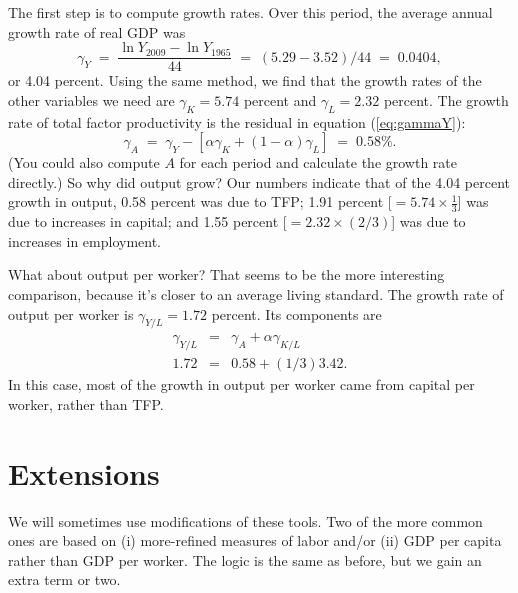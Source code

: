 The first step is to compute growth rates.
Over this period, the average annual growth rate of real GDP was
\[
    \gamma_{Y} \;=\; \frac{\ln Y_{2009} -\ln Y_{1965}}{44}
            \;=\; (5.29-3.52)/44 \;=\; 0.0404,
\]
or 4.04 percent.
Using the same method,
we find that the growth rates of the other variables we need are
 $\gamma_{K}=5.74$ percent and $\gamma_{L}=2.32$ percent.
The growth rate of total factor productivity is the residual
in equation (\ref{eq:gammaY}):
\[
    \gamma_A \;=\; \gamma_Y - \left[ \alpha \gamma_K +
            (1-\alpha) \gamma_L \right]
                \;=\; 0.58\% .
\]
(You could also compute $A$ for each period
and calculate the growth rate directly.)
So why did output grow?
Our numbers indicate that of the 4.04 percent growth in output,
0.58 percent was due to TFP; 1.91 percent [$=5.74\times\frac{1}{3}$] was due to increases in capital;
and 1.55 percent [$=2.32 \times (2/3)$] was due to increases in employment.

What about output per worker?
That seems to be the more interesting comparison,
because it's closer to an average living standard.
The growth rate of output per worker is
$ \gamma_{Y/L} = 1.72$ percent.
Its components are
\begin{eqnarray*}
    \gamma_{Y/L} &=& \gamma_A + \alpha \gamma_{K/L} \\
      1.72   &= & 0.58 + (1/3) 3.42.
\end{eqnarray*}
In this case, most of the growth in output per worker came from
capital per worker, rather than TFP.


\section{Extensions}

We will sometimes use modifications of these tools.
Two of the more common ones are based on
(i) more-refined measures of labor
and/or (ii) GDP per capita rather than GDP per worker.
The logic is the same as before, but we gain an extra term or two.


